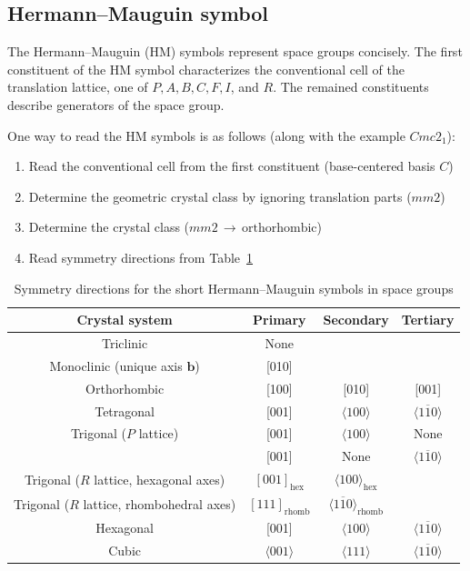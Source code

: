\subsection{Hermann--Mauguin symbol}

The Hermann--Mauguin (HM) symbols represent space groups concisely.
The first constituent of the HM symbol characterizes the conventional cell of the translation lattice, one of $P, A, B, C, F, I$, and $R$.
The remained constituents describe generators of the space group.

One way to read the HM symbols is as follows (along with the example $Cmc2_{1}$):
\begin{enumerate}
  \item Read the conventional cell from the first constituent (base-centered basis $C$)
  \item Determine the geometric crystal class by ignoring translation parts ($mm2$)
  \item Determine the crystal class ($mm2 \, \rightarrow \, \mbox{orthorhombic}$)
  \item Read symmetry directions from Table~\ref{tab:hermann-mauguin}
\end{enumerate}

\begin{table}[htb]
  \caption{Symmetry directions for the short Hermann--Mauguin symbols in space groups}
  \label{tab:hermann-mauguin}
  \centering
  \begin{tabular}{cccc}
    \hline\hline
    Crystal system & Primary & Secondary & Tertiary  \\ \hline
    Triclinic                         & None  & & \\
    Monoclinic (unique axis $\bm{b}$) & [010] & & \\
    Orthorhombic                      & [100] & [010] & [001] \\
    Tetragonal                        & [001] & $\langle 100 \rangle$ & $\langle 1\overline{1}0 \rangle $ \\
    Trigonal ($P$ lattice) & [001] & $\langle 100 \rangle$ & None \\
                           & [001] & None & $\langle 1\overline{1}0 \rangle $ \\
    Trigonal ($R$ lattice, hexagonal axes) &
      $[001]_{\mathrm{hex}}$ & $\langle 100 \rangle_{\mathrm{hex}}$ & \\
    Trigonal ($R$ lattice, rhombohedral axes) &
      $[111]_{\mathrm{rhomb}}$ & $\langle 1\overline{1}0 \rangle_{\mathrm{rhomb}}$ & \\
    Hexagonal                        & [001] & $\langle 100 \rangle$ & $\langle 1\overline{1}0 \rangle$ \\
    Cubic                            & $\langle 001 \rangle$ & $\langle 111 \rangle$ & $\langle 1\overline{1}0 \rangle$ \\
    \hline\hline
  \end{tabular}
\end{table}


